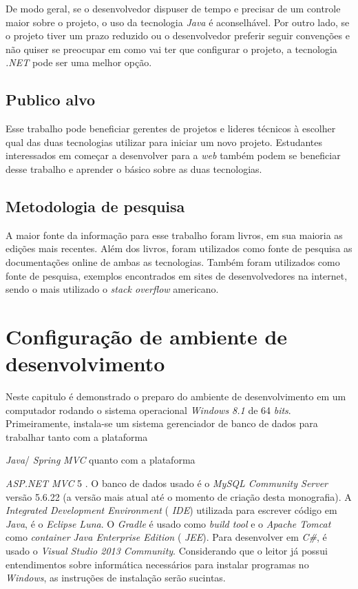 \documentclass[a4paper,12pt]{article}
\newcommand{\anmvc} {
\sigla{ASP.NET MVC} 5
}
\newcommand{\spring} {
\lang{Java}/\est{Spring} \sigla{MVC}
}
\newcommand{\est}[1] {
\textit{#1}}
\newcommand{\sigla}[1] {
\textit{#1}}
\newcommand{\lang}[1] {
\textit{#1}}
\newcommand{\lib}[1] {
\textit{#1}}
\begin{document}
De modo geral, se o desenvolvedor dispuser de tempo e precisar de um controle maior sobre o projeto, o uso da tecnologia \lang{Java} é aconselhável. Por outro lado, se o projeto tiver um prazo reduzido ou o desenvolvedor preferir seguir convenções e não quiser se preocupar em como vai ter que configurar o projeto, a tecnologia \lib{.NET} pode ser uma melhor opção.
 
\subsection{Publico alvo}

Esse trabalho pode beneficiar gerentes de projetos e lideres técnicos à escolher qual das duas tecnologias utilizar para iniciar um novo projeto. Estudantes interessados em começar a desenvolver para a \est{web} também podem se beneficiar desse trabalho e aprender o básico sobre as duas tecnologias.

\subsection{Metodologia de pesquisa}

A maior fonte da informação para esse trabalho foram livros, em sua maioria as edições mais recentes. Além dos livros, foram utilizados como fonte de pesquisa as documentações online de ambas as tecnologias. Também foram utilizados como fonte de pesquisa, exemplos encontrados em sites de desenvolvedores na internet, sendo o mais utilizado o \est{stack overflow} americano.

\newpage
\section{Configuração de ambiente de desenvolvimento}

Neste capitulo é demonstrado o preparo do ambiente de desenvolvimento em um computador rodando o sistema operacional \est{Windows 8.1} de 64 \est{bits}. Primeiramente, instala-se um sistema gerenciador de banco de dados para trabalhar tanto com a plataforma \spring quanto com a plataforma \anmvc.  O banco de dados usado é o \est{MySQL Community Server} versão 5.6.22 (a versão mais atual até o momento de criação desta monografia). A \est{Integrated Development Environment} (\sigla{IDE}) utilizada  para escrever código em \lang{Java}, é o \est{Eclipse Luna}. O \est{Gradle} é usado como \est{build tool} e o \est{Apache Tomcat} como \est{container} \est{Java Enterprise Edition} (\sigla{JEE}). Para desenvolver em \lang{C\#}, é usado o \est{Visual Studio 2013 Community}. Considerando que o leitor já possui entendimentos sobre informática necessários para instalar programas no \est{Windows}, as instruções de instalação serão sucintas. 
\end{document}
